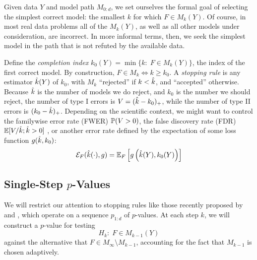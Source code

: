 \documentclass{article}
\begin{document}
Given data $Y$ and model path $M_{0:d}$, we set ourselves the formal goal of selecting the simplest correct model: the smallest $k$ for which $F\in M_k(Y)$. Of course, in most real data problems all of the $M_k(Y)$, as well as all other models under consideration, are incorrect. In more informal terms, then, we seek the simplest model in the path that is not refuted by the available data.


Define the {\em completion index} $k_0(Y) = \min\{k:\; F \in M_k(Y)\}$, the index of the first correct model. By construction, $F\in M_k \iff k \geq k_0$. A {\em stopping rule} is any estimator $\hk(Y)$ of $k_0$, with $M_k$ ``rejected'' if $k < \hk$, and ``accepted'' otherwise. Because $\hk$ is the number of models we do reject, and $k_0$ is the number we should reject, the number of type I errors is $V=(\hk-k_0)_+$, while the number of type II errors is $(k_0-\hk)_+$. Depending on the scientific context, we might want to control the familywise error rate (FWER) $\P(V>0)$, the false discovery rate (FDR) $\E[V/\hk; \hk>0]$ \citep{benjamini1995controlling}, or another error rate defined by the expectation of some loss function $g(\hk, k_0)$:
\begin{equation}\label{eq:errRate}
\Err_F(\hk(\cdot), g) = \E_F\left[ g\left(\hk(Y), k_0(Y)\right)\right]
\end{equation}

\subsection{Single-Step $p$-Values}

We will restrict our attention to stopping rules like those recently proposed by \citet{gsell2013sequential} and \citet{li2015accumulation}, which operate on a sequence $p_{1:d}$ of $p$-values. At each step $k$, we will construct a $p$-value for testing
\[
H_{k}:\; F\in M_{k-1}(Y)
\]
against the alternative that $F\in M_\infty\setminus M_{k-1}$, accounting for the fact that $M_{k-1}$ is chosen adaptively.
\end{document}
